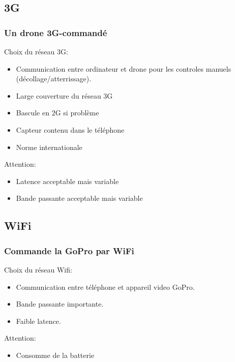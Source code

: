 \documentclass[transparent]{beamer}
\begin{document}
\subsection{3G}

\begin{frame}
\frametitle{Un drone 3G-commandé}
	\begin{block}{Choix du réseau 3G:}
		\begin{itemize}
			\item Communication entre ordinateur et drone pour les controles manuels (décollage/atterrissage).
			\item Large couverture du réseau 3G
			\item Bascule en 2G si problème
			\item Capteur contenu dans le téléphone
			\item Norme internationale
		\end{itemize}
	\end{block}
	\begin{block}{Attention:}
		\begin{itemize}
			\item Latence acceptable mais variable
			\item Bande passante acceptable mais variable
		\end{itemize}
	\end{block}
\end{frame}

\subsection{WiFi}

\begin{frame}
\frametitle{Commande la GoPro par WiFi}
	\begin{block}{Choix du réseau Wifi:}
			\begin{itemize}
				\item Communication entre téléphone et appareil video GoPro.
				\item Bande passante importante.
				\item Faible latence.
			\end{itemize}
	\end{block}
	\begin{block}{Attention:}
			\begin{itemize}
				\item Consomme de la batterie
			\end{itemize}
	\end{block}
\end{frame}
\end{document}
